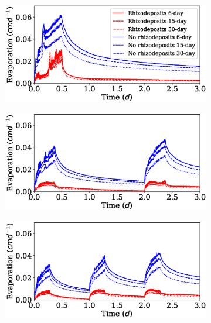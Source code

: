 \documentclass[11pt,a4paper]{article}
\numberwithin{equation}{section}
\begin{document}
\begin{figure}
	\begin{subfigure}{0.32\textwidth}
		\includegraphics[width = \linewidth, keepaspectratio] {ev_ppat1ptot0_28.eps}
		\caption{}
	\end{subfigure}
	\begin{subfigure}{0.32\textwidth}
		\includegraphics[width = \linewidth, keepaspectratio] {ev_ppat2ptot0_28.eps}
		\caption{}
	\end{subfigure}
	\begin{subfigure}{0.32\textwidth}
		\includegraphics[width = \linewidth, keepaspectratio] {ev_ppat3ptot0_28.eps}
		\caption{}
	\end{subfigure}\\

\end{figure}
\end{document}
